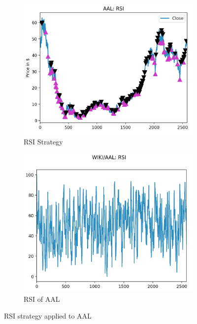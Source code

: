 \documentclass[letterpaper,11pt]{article}
\begin{document}
\begin{figure}[h]
\begin{subfigure}[t]{0.45\textwidth}
\includegraphics[width=\textwidth]{AAL_RSI_signals.png}
\caption{RSI Strategy \label{overflow}}
\end{subfigure}
\begin{subfigure}[t]{0.45\textwidth}
\includegraphics[width=\textwidth]{AAL_RSI.png}
\caption{ RSI of AAL \label{overflow}}
\end{subfigure}

\caption{RSI strategy applied to AAL  \label{overflow}}
\label{RSIfigure}
\end{figure}
\end{document}
